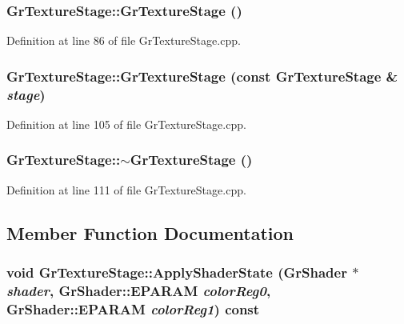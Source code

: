 \begin{CompactItemize}
{\subsubsection[{GrTextureStage}]{\setlength{\rightskip}{0pt plus 5cm}GrTextureStage::GrTextureStage ()}}
\label{class_gr_texture_stage_eac3752fc6e0acac79696710b9eb0598}




Definition at line 86 of file GrTextureStage.cpp.\hypertarget{class_gr_texture_stage_6378461758f772d3668fecbb8b9f133a}{
\subsubsection[{GrTextureStage}]{\setlength{\rightskip}{0pt plus 5cm}GrTextureStage::GrTextureStage (const {\bf GrTextureStage} \& {\em stage})}}
\label{class_gr_texture_stage_6378461758f772d3668fecbb8b9f133a}




Definition at line 105 of file GrTextureStage.cpp.\hypertarget{class_gr_texture_stage_ed8757fd8de2d75111b96aba86c1b195}{
\subsubsection[{$\sim$GrTextureStage}]{\setlength{\rightskip}{0pt plus 5cm}GrTextureStage::$\sim$GrTextureStage ()}}
\label{class_gr_texture_stage_ed8757fd8de2d75111b96aba86c1b195}




Definition at line 111 of file GrTextureStage.cpp.

\subsection{Member Function Documentation}
\hypertarget{class_gr_texture_stage_f8e83134d46afc43e868f5069b065e29}{
\subsubsection[{ApplyShaderState}]{\setlength{\rightskip}{0pt plus 5cm}void GrTextureStage::ApplyShaderState ({\bf GrShader} $\ast$ {\em shader}, \/  {\bf GrShader::EPARAM} {\em colorReg0}, \/  {\bf GrShader::EPARAM} {\em colorReg1}) const}}
\label{class_gr_texture_stage_f8e83134d46afc43e868f5069b065e29}





\end{CompactItemize}
